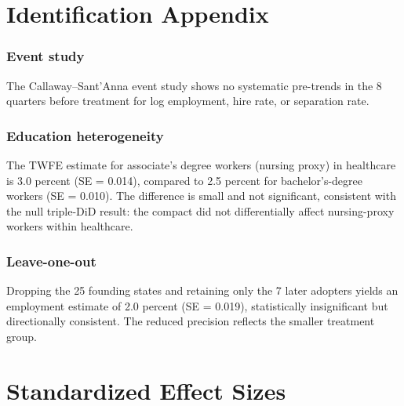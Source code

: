 \documentclass[12pt]{article}
\begin{document}
\section{Identification Appendix}

\subsubsection*{Event study} The Callaway--Sant'Anna event study shows no systematic pre-trends in the 8 quarters before treatment for log employment, hire rate, or separation rate.

\subsubsection*{Education heterogeneity} The TWFE estimate for associate's degree workers (nursing proxy) in healthcare is 3.0 percent (SE = 0.014), compared to 2.5 percent for bachelor's-degree workers (SE = 0.010). The difference is small and not significant, consistent with the null triple-DiD result: the compact did not differentially affect nursing-proxy workers within healthcare.

\subsubsection*{Leave-one-out} Dropping the 25 founding states and retaining only the 7 later adopters yields an employment estimate of 2.0 percent (SE = 0.019), statistically insignificant but directionally consistent. The reduced precision reflects the smaller treatment group.

\section{Standardized Effect Sizes}
\label{sec:sde}


\end{document}
